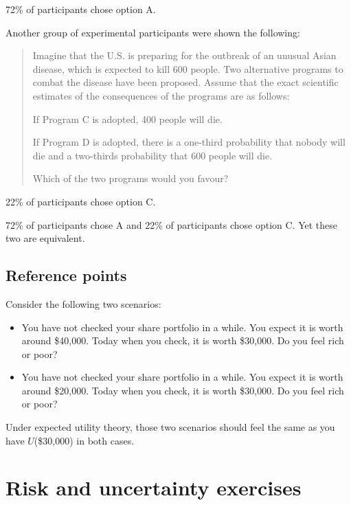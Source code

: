 \documentclass[
  letterpaper,
  DIV=11,
  numbers=noendperiod]{scrreprt}
\begin{document}
72\% of participants chose option A.

Another group of experimental participants were shown the following:

\begin{quote}
Imagine that the U.S. is preparing for the outbreak of an unusual Asian
disease, which is expected to kill 600 people. Two alternative programs
to combat the disease have been proposed. Assume that the exact
scientific estimates of the consequences of the programs are as follows:

If Program C is adopted, 400 people will die.

If Program D is adopted, there is a one-third probability that nobody
will die and a two-thirds probability that 600 people will die.

Which of the two programs would you favour?
\end{quote}

22\% of participants chose option C.

72\% of participants chose A and 22\% of participants chose option C.
Yet these two are equivalent.

\hypertarget{reference-points}{%
\section{Reference points}\label{reference-points}}

Consider the following two scenarios:

\begin{itemize}
\item
  You have not checked your share portfolio in a while. You expect it is
  worth around \$40,000. Today when you check, it is worth \$30,000. Do
  you feel rich or poor?
\item
  You have not checked your share portfolio in a while. You expect it is
  worth around \$20,000. Today when you check, it is worth \$30,000. Do
  you feel rich or poor?
\end{itemize}

Under expected utility theory, those two scenarios should feel the same
as you have \(U\)(\$30,000) in both cases.

\hypertarget{risk-and-uncertainty-exercises}{%
\chapter{Risk and uncertainty
exercises}\label{risk-and-uncertainty-exercises}}
\end{document}
